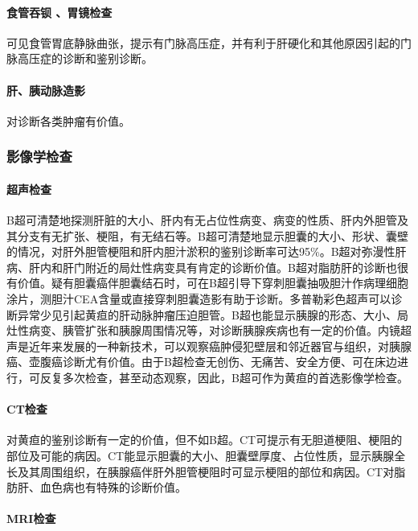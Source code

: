 \paragraph{食管吞钡 、胃镜检查}

可见食管胃底静脉曲张，提示有门脉高压症，并有利于肝硬化和其他原因引起的门脉高压症的诊断和鉴别诊断。

\paragraph{肝、胰动脉造影}

对诊断各类肿瘤有价值。

\subsubsection{影像学检查}

\paragraph{超声检查}

B超可清楚地探测肝脏的大小、肝内有无占位性病变、病变的性质、肝内外胆管及其分支有无扩张、梗阻，有无结石等。B超可清楚地显示胆囊的大小、形状、囊壁的情况，对肝外胆管梗阻和肝内胆汁淤积的鉴别诊断率可达95\%。B超对弥漫性肝病、肝内和肝门附近的局灶性病变具有肯定的诊断价值。B超对脂肪肝的诊断也很有价值。疑有胆囊癌伴胆囊结石时，可在B超引导下穿刺胆囊抽吸胆汁作病理细胞涂片，测胆汁CEA含量或直接穿刺胆囊造影有助于诊断。多普勒彩色超声可以诊断异常少见引起黄疸的肝动脉肿瘤压迫胆管。B超也能显示胰腺的形态、大小、局灶性病变、胰管扩张和胰腺周围情况等，对诊断胰腺疾病也有一定的价值。内镜超声是近年来发展的一种新技术，可以观察癌肿侵犯壁层和邻近器官与组织，对胰腺癌、壶腹癌诊断尤有价值。由于B超检查无创伤、无痛苦、安全方便、可在床边进行，可反复多次检查，甚至动态观察，因此，B超可作为黄疸的首选影像学检查。

\paragraph{CT检查}

对黄疸的鉴别诊断有一定的价值，但不如B超。CT可提示有无胆道梗阻、梗阻的部位及可能的病因。CT能显示胆囊的大小、胆囊壁厚度、占位性质，显示胰腺全长及其周围组织，在胰腺癌伴肝外胆管梗阻时可显示梗阻的部位和病因。CT对脂肪肝、血色病也有特殊的诊断价值。

\paragraph{MRI检查}

